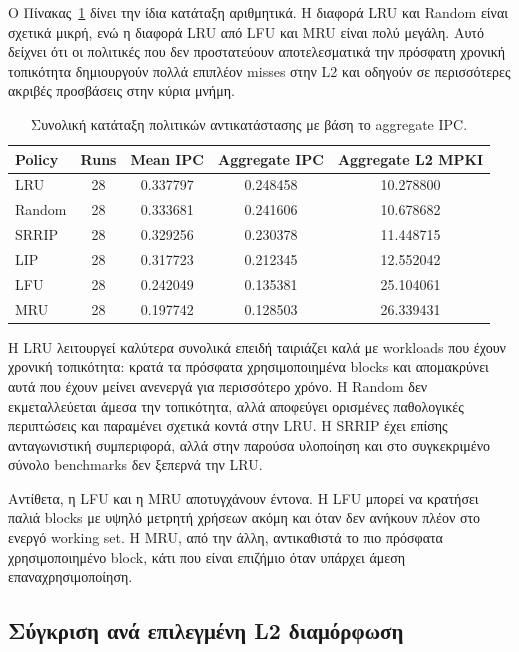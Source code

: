\documentclass{article}
\begin{document}
Ο Πίνακας~\ref{tab:policy-overall} δίνει την ίδια κατάταξη αριθμητικά. Η διαφορά LRU και Random είναι σχετικά μικρή, ενώ η διαφορά LRU από LFU και MRU είναι πολύ μεγάλη. Αυτό δείχνει ότι οι πολιτικές που δεν προστατεύουν αποτελεσματικά την πρόσφατη χρονική τοπικότητα δημιουργούν πολλά επιπλέον misses στην L2 και οδηγούν σε περισσότερες ακριβές προσβάσεις στην κύρια μνήμη.

\begin{table}[htbp]
\centering
\caption{Συνολική κατάταξη πολιτικών αντικατάστασης με βάση το aggregate IPC.}
\label{tab:policy-overall}
\begin{tabular}{lcccc}
\toprule
\textbf{Policy} & \textbf{Runs} & \textbf{Mean IPC} & \textbf{Aggregate IPC} & \textbf{Aggregate L2 MPKI} \\
\midrule
LRU & 28 & 0.337797 & 0.248458 & 10.278800 \\
Random & 28 & 0.333681 & 0.241606 & 10.678682 \\
SRRIP & 28 & 0.329256 & 0.230378 & 11.448715 \\
LIP & 28 & 0.317723 & 0.212345 & 12.552042 \\
LFU & 28 & 0.242049 & 0.135381 & 25.104061 \\
MRU & 28 & 0.197742 & 0.128503 & 26.339431 \\
\bottomrule
\end{tabular}
\end{table}

Η LRU λειτουργεί καλύτερα συνολικά επειδή ταιριάζει καλά με workloads που έχουν χρονική τοπικότητα: κρατά τα πρόσφατα χρησιμοποιημένα blocks και απομακρύνει αυτά που έχουν μείνει ανενεργά για περισσότερο χρόνο. Η Random δεν εκμεταλλεύεται άμεσα την τοπικότητα, αλλά αποφεύγει ορισμένες παθολογικές περιπτώσεις και παραμένει σχετικά κοντά στην LRU. Η SRRIP έχει επίσης ανταγωνιστική συμπεριφορά, αλλά στην παρούσα υλοποίηση και στο συγκεκριμένο σύνολο benchmarks δεν ξεπερνά την LRU.

Αντίθετα, η LFU και η MRU αποτυγχάνουν έντονα. Η LFU μπορεί να κρατήσει παλιά blocks με υψηλό μετρητή χρήσεων ακόμη και όταν δεν ανήκουν πλέον στο ενεργό working set. Η MRU, από την άλλη, αντικαθιστά το πιο πρόσφατα χρησιμοποιημένο block, κάτι που είναι επιζήμιο όταν υπάρχει άμεση επαναχρησιμοποίηση.

\subsection{Σύγκριση ανά επιλεγμένη L2 διαμόρφωση}
\end{document}

